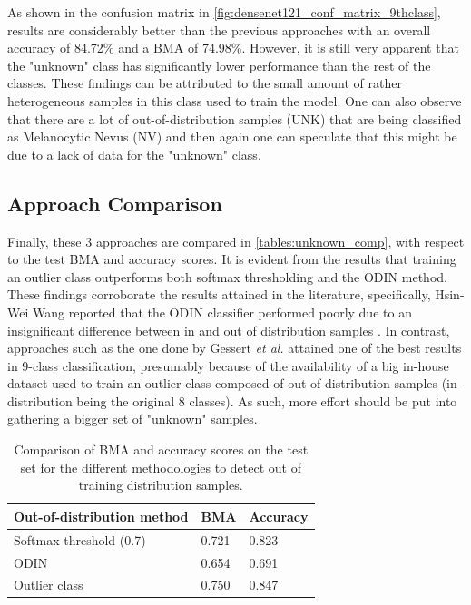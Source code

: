         As shown in the confusion matrix in \autoref{fig:densenet121_conf_matrix_9thclass}, results are considerably better than the previous approaches with an overall accuracy of 84.72\% and a \ac{BMA} of 74.98\%. However, it is still very apparent that the "unknown" class has significantly lower performance than the rest of the classes. These findings can be attributed to the small amount of rather heterogeneous samples in this class used to train the model. One can also observe that there are a lot of out-of-distribution samples (UNK) that are being classified as Melanocytic Nevus (NV) and then again one can speculate that this might be due to a lack of data for the "unknown" class. \par
        
    \subsection{Approach Comparison}
    Finally, these 3 approaches are compared in \autoref{tables:unknown_comp}, with respect to the test \ac{BMA} and accuracy scores. It is evident from the results that training an outlier class outperforms both softmax thresholding and the \ac{ODIN} method. These findings corroborate the results attained in the literature, specifically, Hsin-Wei Wang reported that the \ac{ODIN} classifier performed poorly due to an insignificant difference between in and out of distribution samples \cite{Wang}. In contrast, approaches such as the one done by Gessert \textit{et al.} \cite{isic2019first} attained one of the best results in 9-class classification, presumably because of the availability of a big in-house dataset used to train an outlier class composed of out of distribution samples (in-distribution being the original 8 classes). As such, more effort should be put into gathering a bigger set of "unknown" samples. \par
    \begin{table}[h]
        \centering
        \begin{tabularx}{\textwidth}{|l|X|X|}
            \hline
            Out-of-distribution method & \ac{BMA} & Accuracy \\ \hline
            Softmax threshold (0.7) & 0.721 & 0.823 \\ \hline
            \ac{ODIN} & 0.654 & 0.691 \\ \hline
            Outlier class & 0.750 & 0.847 \\ \hline
        \end{tabularx}
        \caption{Comparison of \ac{BMA} and accuracy scores on the test set for the different methodologies to detect out of training distribution samples.}
        \label{tables:unknown_comp}
    \end{table} 
    
